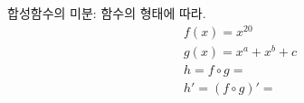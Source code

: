 \documentclass[aspectratio=169]{beamer}
\begin{document}
\begin{frame}{합성함수의 미분: 함수의 형태에 따라.}
      \begin{align*}
        & f(x) = x^{20} \\
        & g(x) = x^{a} + x^{b} + c \\
        & h = {f} \circ {g} = \\ 
        & h' =  ( {f} \circ {g} )' = \\
      \end{align*}
\end{frame}








  
\end{document}
